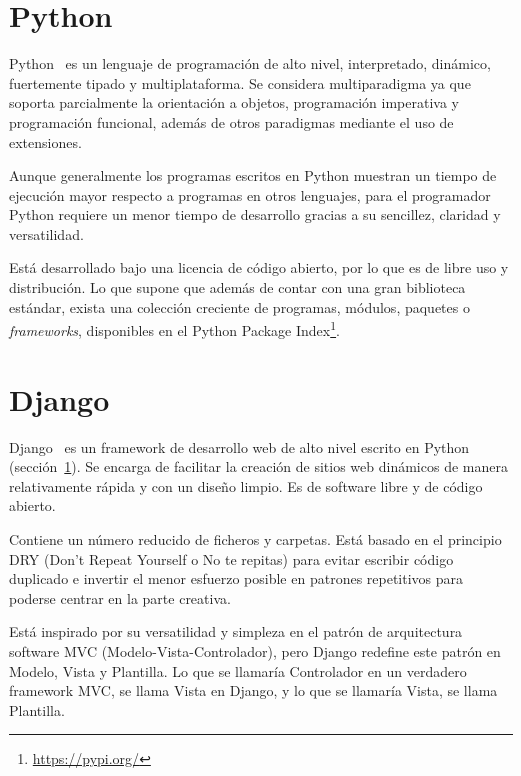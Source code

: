 \documentclass[a4paper, 12pt]{book}
\begin{document}
\section{Python}
\label{sec:python}

Python~\cite{python} es un lenguaje de programación de alto nivel, interpretado, dinámico, fuertemente tipado y multiplataforma.
Se considera multiparadigma ya que soporta parcialmente la orientación a objetos, programación imperativa y programación funcional, además de otros paradigmas mediante el uso de extensiones.

\vspace{5mm}
Aunque generalmente los programas escritos en Python muestran un tiempo de ejecución mayor respecto a programas en otros lenguajes, para el programador Python requiere un menor tiempo de desarrollo gracias a su sencillez, claridad y versatilidad.

\vspace{5mm}
Está desarrollado bajo una licencia de código abierto, por lo que es de libre uso y distribución.
Lo que supone que además de contar con una gran biblioteca estándar, exista una colección creciente de programas, módulos, paquetes o \emph{frameworks}, disponibles en el Python Package Index\footnote{\url{https://pypi.org/}}.


\section{Django}
\label{sec:django}

Django~\cite{django} es un framework de desarrollo web de alto nivel escrito en Python (sección~\ref{sec:python}).
Se encarga de facilitar la creación de sitios web dinámicos de manera relativamente rápida y con un diseño limpio.
Es de software libre y de código abierto.

\vspace{5mm}
Contiene un número reducido de ficheros y carpetas.
Está basado en el principio DRY (Don't Repeat Yourself o No te repitas) para evitar escribir código duplicado e invertir el menor esfuerzo posible en patrones repetitivos para poderse centrar en la parte creativa.

\vspace{5mm} %
Está inspirado por su versatilidad y simpleza en el patrón de arquitectura software MVC (Modelo-Vista-Controlador), pero Django redefine este patrón en Modelo, Vista y Plantilla.
Lo que se llamaría Controlador en un verdadero framework MVC, se llama Vista en Django, y lo que se llamaría Vista, se llama Plantilla.
\end{document}
